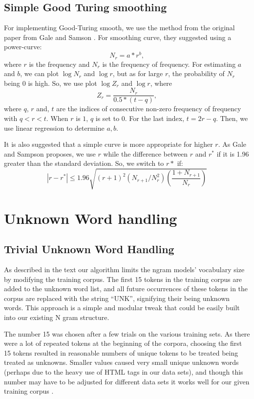 \documentclass[12pt]{article}
\begin{document}
\subsection{Simple Good Turing smoothing}

For implementing Good-Turing smooth, we use the method from the original
paper from Gale and Samson \cite{gale1995good}. For smoothing curve,
they suggested using a power-curve:
\[N_r = a * r^b,\]
where $r$ is the frequency and $N_r$ is the frequency of frequency. For
estimating $a$ and $b$, we can plot $\log N_r$ and $\log r$, but as for
large $r$, the probability of $N_r$ being $0$ is high. So, we use plot
$\log Z_r$ and $\log r$, where
\[Z_r = \frac{N_r}{0.5 * (t-q)},\]
where $q$, $r$ and, $t$ are the indices of consecutive non-zero frequency
of frequency with $q < r < t$. When $r$ is $1$, $q$ is set to 0. For the
last index, $t = 2r - q$. Then, we use linear regression to determine $a, b$.

It is also suggested that a simple curve is more appropriate for higher $r$.
As Gale and Sampson \cite{gale1995good} proposes, we use $r$ while the
difference between $r$ and $r^{*}$ if it is 1.96 greater than the
standard deviation. So, we switch to $r*$ if:
\[ |r - r^*| \leq 1.96 \sqrt{(r+1)^2 \left(N_{r + 1} / N_{r}^{2}\right)
\left(\frac{1 + N_{r+1}}{N_r}\right)}\]


\section{Unknown Word handling}
\subsection{Trivial Unknown Word Handling}


As described in the text \cite{jurafskybook2009} our algorithm limits the ngram models’ vocabulary size by modifying the training corpus. The first 15 tokens in the training corpus are added to the unknown word list, and all future occurrences of these tokens in the corpus are replaced with the string ``UNK'', signifying their being unknown words. This approach is a simple and modular tweak that could be easily built into our existing N gram structure.

The number 15 was chosen after a few trials on the various training sets. As there were a lot of repeated tokens at the beginning of the corpora, choosing the first 15 tokens resulted in reasonable numbers of unique tokens to be treated being treated as unknowns. Smaller values caused very small unique unknown words (perhaps due to the heavy use of HTML tags in our data sets), and though this number may have to be adjusted for different data sets it works well for our given training corpus .
\end{document}
